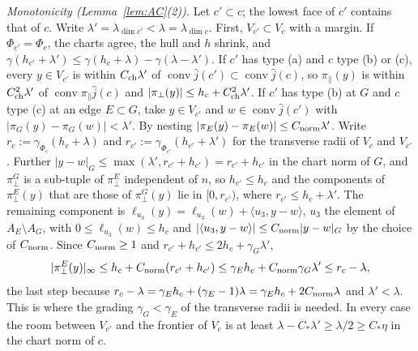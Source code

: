 \emph{Monotonicity (Lemma~\ref{lem:AC}(2)).} Let $c'\subset c$; the lowest face of $c'$ contains that of $c$. Write $\lambda'=\lambda_{\dim c'}<\lambda=\lambda_{\dim c}$. First, $V_{c'}\subset V_c$ with a margin. If $\Phi_{c'}=\Phi_c$, the charts agree, the hull and $h$ shrink, and $\gamma(h_{c'}+\lambda')\le \gamma(h_c+\lambda)-\gamma(\lambda-\lambda')$. If $c'$ has type (a) and $c$ type (b) or (c), every $y\in V_{c'}$ is within $C_{\rm ch}\lambda'$ of $\operatorname{conv}\hat j(c')\subset\operatorname{conv}\hat j(c)$, so $\pi_\parallel(y)$ is within $C_{\rm ch}^2\lambda'$ of $\operatorname{conv}\pi_\parallel\hat j(c)$ and $|\pi_\perp(y)|\le h_c+C_{\rm ch}^2\lambda'$. If $c'$ has type (b) at $G$ and $c$ type (c) at an edge $E\subset G$, take $y\in V_{c'}$ and $w\in\operatorname{conv}\hat j(c')$ with $|\pi_G(y)-\pi_G(w)|<\lambda'$. By nesting $|\pi_E(y)-\pi_E(w)|\le C_{\rm norm}\lambda'$. Write $r_c:=\gamma_{\Phi_c}(h_c+\lambda)$ and $r_{c'}:=\gamma_{\Phi_{c'}}(h_{c'}+\lambda')$ for the transverse radii of $V_c$
and $V_{c'}$. Further $|y-w|_G\le\max(\lambda',r_{c'}+h_{c'})=r_{c'}+h_{c'}$ in the chart norm of $G$, and $\pi^G_\perp$ is a sub-tuple of $\pi^E_\perp$ independent of $n$, so $h_{c'}\le h_c$ and the components of $\pi^E_\perp(y)$ that are those of $\pi^G_\perp(y)$ lie in $[0,r_{c'})$, where $r_{c'}\le h_c+\lambda'$. The remaining component is $\ell_{u_3}(y)=\ell_{u_3}(w)+\langle u_3,y-w\rangle$, $u_3$ the element of $A_E\setminus A_G$, with $0\le\ell_{u_3}(w)\le h_c$ and $|\langle u_3,y-w\rangle|\le C_{\rm norm}|y-w|_G$ by the choice of $C_{\rm norm}$. Since $C_{\rm norm}\ge1$ and $r_{c'}+h_{c'}\le2h_c+\gamma_G\lambda'$,
\[
|\pi^E_\perp(y)|_\infty\le h_c+C_{\rm norm}(r_{c'}+h_{c'})\le \gamma_Eh_c+C_{\rm norm}\gamma_G\lambda'\le r_c-\lambda ,
\]
the last step because $r_c-\lambda=\gamma_Eh_c+(\gamma_E-1)\lambda=\gamma_Eh_c+2C_{\rm norm}\lambda$ and $\lambda'<\lambda$.
This is where the grading $\gamma_G<\gamma_E$ of the transverse radii is needed. In every case the room between $V_{c'}$ and the frontier of $V_c$ is at least $\lambda-C_*\lambda'\ge\lambda/2\ge C_*\eta$ in the chart norm of $c$.

